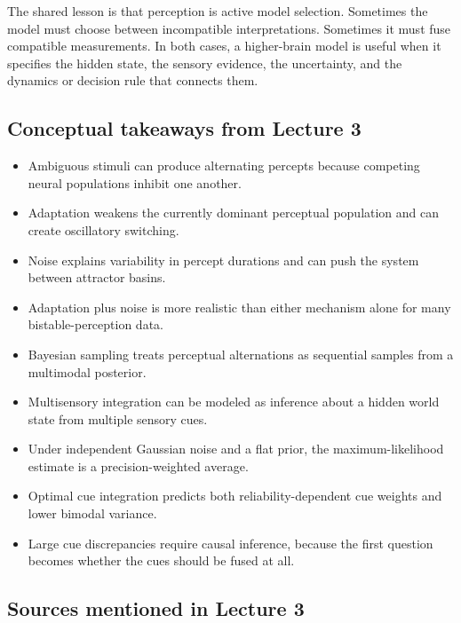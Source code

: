 The shared lesson is that perception is active model selection. Sometimes the model must choose between incompatible interpretations. Sometimes it must fuse compatible measurements. In both cases, a higher-brain model is useful when it specifies the hidden state, the sensory evidence, the uncertainty, and the dynamics or decision rule that connects them.

\subsection{Conceptual takeaways from Lecture 3}

\begin{itemize}
    \item Ambiguous stimuli can produce alternating percepts because competing neural populations inhibit one another.
    \item Adaptation weakens the currently dominant perceptual population and can create oscillatory switching.
    \item Noise explains variability in percept durations and can push the system between attractor basins.
    \item Adaptation plus noise is more realistic than either mechanism alone for many bistable-perception data.
    \item Bayesian sampling treats perceptual alternations as sequential samples from a multimodal posterior.
    \item Multisensory integration can be modeled as inference about a hidden world state from multiple sensory cues.
    \item Under independent Gaussian noise and a flat prior, the maximum-likelihood estimate is a precision-weighted average.
    \item Optimal cue integration predicts both reliability-dependent cue weights and lower bimodal variance.
    \item Large cue discrepancies require causal inference, because the first question becomes whether the cues should be fused at all.
\end{itemize}

\subsection*{Sources mentioned in Lecture 3}

